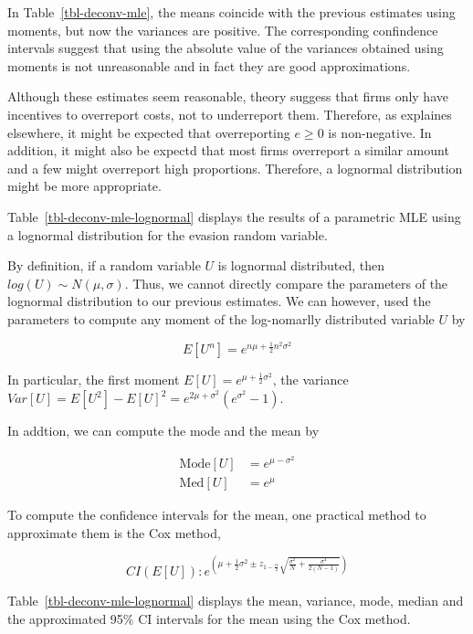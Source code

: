 \documentclass[
  12pt]{article}
\theoremstyle{definition}
\theoremstyle{remark}
\begin{document}
In Table~\ref{tbl-deconv-mle}, the means coincide with the previous
estimates using moments, but now the variances are positive. The
corresponding confindence intervals suggest that using the absolute
value of the variances obtained using moments is not unreasonable and in
fact they are good approximations.

Although these estimates seem reasonable, theory suggess that firms only
have incentives to overreport costs, not to underreport them. Therefore,
as explaines elsewhere, it might be expected that overreporting
\(e\ge0\) is non-negative. In addition, it might also be expectd that
most firms overreport a similar amount and a few might overreport high
proportions. Therefore, a lognormal distribution might be more
appropriate.

Table~\ref{tbl-deconv-mle-lognormal} displays the results of a
parametric MLE using a lognormal distribution for the evasion random
variable.

By definition, if a random variable \(U\) is lognormal distributed, then
\(log(U)\sim N(\mu, \sigma)\). Thus, we cannot directly compare the
parameters of the lognormal distribution to our previous estimates. We
can however, used the parameters to compute any moment of the
log-nomarlly distributed variable \(U\) by

\[
E[U^n]=e^{n\mu+\frac{1}{2}n^2\sigma^2}
\]

In particular, the first moment \(E[U]=e^{\mu+\frac{1}{2}\sigma^2}\),
the variance \(Var[U]=E[U^2]-E[U]^2=e^{2\mu+\sigma^2}(e^{\sigma^2}-1)\).

In addtion, we can compute the mode and the mean by

\[
\begin{aligned}
  \text{Mode}[U]&=e^{\mu-\sigma^2} \\
  \text{Med}[U]&=e^{\mu}
\end{aligned}
\]

To compute the confidence intervals for the mean, one practical method
to approximate them is the Cox method,

\[
CI(E[U]): e^{\left(\mu+\frac{1}{2}\sigma^2 \pm z_{1-\frac{\alpha}{2}}\sqrt{\frac{\sigma^2}{N}+\frac{\sigma^4}{2(N-1)}}\right)}
\]

Table~\ref{tbl-deconv-mle-lognormal} displays the mean, variance, mode,
median and the approximated 95\% CI intervals for the mean using the Cox
method.
\end{document}
